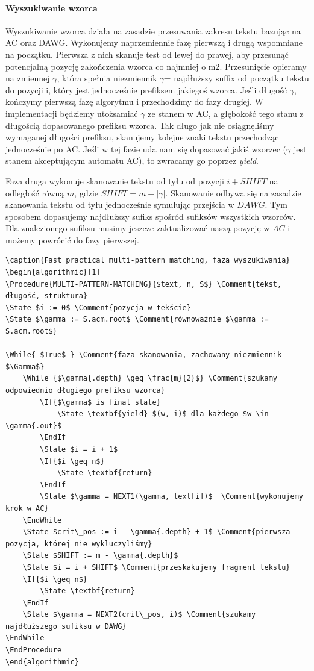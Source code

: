 \paragraph{Wyszukiwanie wzorca}

Wyszukiwanie wzorca działa na zasadzie przesuwania zakresu tekstu bazując na AC oraz DAWG. Wykonujemy naprzemiennie fazę pierwszą i drugą wspomniane na początku. Pierwsza z nich skanuje test od lewej do prawej, aby przesunąć potencjalną pozycję zakończenia wzorca co najmniej o m2. Przesunięcie opieramy na zmiennej $\gamma$, która spełnia niezmiennik $\gamma$= najdłuższy suffix od początku tekstu do pozycji i, który jest jednocześnie prefiksem jakiegoś wzorca. Jeśli długość $\gamma$, kończymy pierwszą fazę algorytmu i przechodzimy do fazy drugiej. W implementacji będziemy utożsamiać $\gamma$ ze stanem w AC, a głębokość tego stanu z długością dopasowanego prefiksu wzorca. Tak długo jak nie osiągnęliśmy wymaganej długości prefiksu, skanujemy kolejne znaki tekstu przechodząc jednocześnie po AC. Jeśli w tej fazie uda nam się dopasować jakiś wzorzec ($\gamma$ jest stanem akceptującym automatu AC), to zwracamy go poprzez \textit{yield}.

Faza druga wykonuje skanowanie tekstu od tyłu od pozycji $i + SHIFT$ na odległość równą $m$, gdzie $SHIFT = m - |\gamma|$. Skanowanie odbywa się na zasadzie skanowania tekstu od tyłu jednocześnie symulując przejścia w $DAWG$. Tym sposobem dopasujemy najdłuższy sufiks spośród sufiksów wszystkich wzorców. Dla znalezionego sufiksu musimy jeszcze zaktualizować naszą pozycję w $AC$ i możemy powrócić do fazy pierwszej. 

\begin{verbatim}
\caption{Fast practical multi-pattern matching, faza wyszukiwania}
\begin{algorithmic}[1]
\Procedure{MULTI-PATTERN-MATCHING}{$text, n, S$} \Comment{tekst, długość, struktura}
\State $i := 0$ \Comment{pozycja w tekście}
\State $\gamma := S.acm.root$ \Comment{równoważnie $\gamma := S.acm.root$}

\While{ $True$ } \Comment{faza skanowania, zachowany niezmiennik $\Gamma$}
    \While {$\gamma{.depth} \geq \frac{m}{2}$} \Comment{szukamy odpowiednio długiego prefiksu wzorca}
        \If{$\gamma$ is final state}
            \State \textbf{yield} $(w, i)$ dla każdego $w \in \gamma{.out}$
        \EndIf
        \State $i = i + 1$
        \If{$i \geq n$}
            \State \textbf{return}
        \EndIf
        \State $\gamma = NEXT1(\gamma, text[i])$  \Comment{wykonujemy krok w AC}
    \EndWhile
    \State $crit\_pos := i - \gamma{.depth} + 1$ \Comment{pierwsza pozycja, której nie wykluczyliśmy}
    \State $SHIFT := m - \gamma{.depth}$ 
    \State $i = i + SHIFT$ \Comment{przeskakujemy fragment tekstu}
    \If{$i \geq n$}
        \State \textbf{return}
    \EndIf
    \State $\gamma = NEXT2(crit\_pos, i)$ \Comment{szukamy najdłuższego sufiksu w DAWG}
\EndWhile
\EndProcedure
\end{algorithmic}
\end{verbatim}

